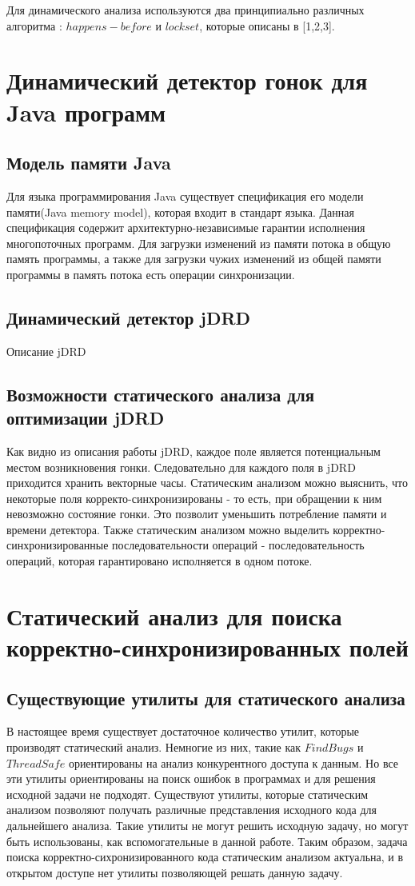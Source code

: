 Для динамического анализа используются два принципиально различных алгоритма : $happens-before$ и $lockset$, которые описаны в [1,2,3].


\FloatBarrier
\section{Динамический детектор гонок для Java программ}
\FloatBarrier
\subsection{Модель памяти Java}
Для языка программирования Java существует спецификация его модели памяти(Java memory model), которая входит в стандарт языка. Данная спецификация содержит архитектурно-независимые гарантии исполнения многопоточных программ.
Для загрузки изменений из памяти потока в общую память программы, а также для загрузки чужих изменений из общей памяти программы в память потока есть операции синхронизации.



\subsection{Динамический детектор jDRD}
Описание jDRD

\subsection{Возможности статического анализа для оптимизации jDRD}
Как видно из описания работы jDRD, каждое поле является потенциальным местом возникновения гонки.  
Следовательно для каждого поля в jDRD приходится хранить векторные часы. Статическим анализом можно выяснить, что некоторые поля корректо-синхронизированы - то есть, при обращении к ним невозможно состояние гонки. Это позволит уменьшить потребление памяти и времени детектора. Также статическим анализом можно выделить корректно-синхронизированные последовательности операций - последовательность операций, которая гарантировано исполняется в одном потоке.
\section{Статический анализ для поиска корректно-синхронизированных полей}

\subsection{Существующие утилиты для статического анализа}
В настоящее время существует достаточное количество утилит, которые производят статический анализ. Немногие из них, такие как $FindBugs$ и $ThreadSafe$ ориентированы на анализ конкурентного доступа к данным. Но все эти утилиты ориентированы на поиск ошибок в программах и для решения исходной задачи не подходят.
Существуют утилиты, которые статическим анализом позволяют получать различные представления исходного кода для дальнейшего анализа. Такие утилиты не могут решить исходную задачу, но могут быть использованы, как вспомогательные в данной работе. 
Таким образом, задача поиска корректно-сихронизированного кода статическим анализом актуальна, и в открытом доступе нет утилиты позволяющей решать данную задачу. 
